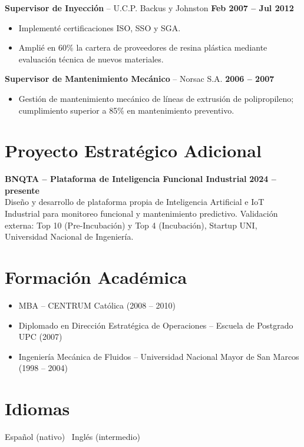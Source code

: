 \documentclass[10pt,a4paper]{article}
\begin{document}
\textbf{Supervisor de Inyecci\'on} -- U.C.P. Backus y Johnston \hfill \textbf{Feb 2007 -- Jul 2012}
\begin{itemize}
  \item Implement\'e certificaciones ISO, SSO y SGA.
  \item Ampli\'e en 60\% la cartera de proveedores de resina pl\'astica mediante evaluaci\'on t\'ecnica de nuevos materiales.
\end{itemize}

\textbf{Supervisor de Mantenimiento Mec\'anico} -- Norsac S.A. \hfill \textbf{2006 -- 2007}
\begin{itemize}
  \item Gesti\'on de mantenimiento mec\'anico de l\'ineas de extrusi\'on de polipropileno; cumplimiento superior a 85\% en mantenimiento preventivo.
\end{itemize}

\section*{Proyecto Estrat\'egico Adicional}
\textbf{BNQTA -- Plataforma de Inteligencia Funcional Industrial} \hfill \textbf{2024 -- presente}\\
Dise\~no y desarrollo de plataforma propia de Inteligencia Artificial e IoT Industrial para monitoreo funcional y mantenimiento predictivo. Validaci\'on externa: Top 10 (Pre-Incubaci\'on) y Top 4 (Incubaci\'on), Startup UNI, Universidad Nacional de Ingenier\'ia.

\section*{Formaci\'on Acad\'emica}
\begin{itemize}
  \item MBA -- CENTRUM Cat\'olica (2008 -- 2010)
  \item Diplomado en Direcci\'on Estrat\'egica de Operaciones -- Escuela de Postgrado UPC (2007)
  \item Ingenier\'ia Mec\'anica de Fluidos -- Universidad Nacional Mayor de San Marcos (1998 -- 2004)
\end{itemize}

\section*{Idiomas}
Espa\~nol (nativo) \textbullet\ Ingl\'es (intermedio)
\end{document}
